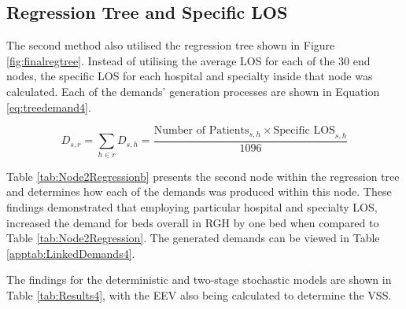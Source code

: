 \documentclass[../thesis.tex]{subfiles}
\begin{document}
\subsection{Regression Tree and Specific LOS}
The second method also utilised the regression tree shown in Figure \ref{fig:finalregtree}. Instead of utilising the average LOS for each of the 30 end nodes, the specific LOS for each hospital and specialty inside that node was calculated. Each of the demands' generation processes are shown in Equation \eqref{eq:treedemand4}.

\begin{equation}\label{eq:treedemand4}
        D_{s,r} = \sum\limits_{h \in r} D_{s,h} = \frac{\text{Number of Patients}_{s,h}\times{\text{Specific LOS}_{s,h}}}{1096}
\end{equation}

Table \ref{tab:Node2Regressionb} presents the second node within the regression tree and determines how each of the demands was produced within this node. These findings demonstrated that employing particular hospital and specialty LOS, increased the demand for beds overall in RGH by one bed when compared to Table \ref{tab:Node2Regression}. The generated demands can be viewed in Table \ref{apptab:LinkedDemands4}.

\begin{table}[h!]
    \centering{}
    \caption{The count of admissions and the associated specific LOS for each hospital and specialty within the second node of the regression tree. The average daily bed demand has additionally been calculated.}
    \label{tab:Node2Regressionb}
\end{table}

The findings for the deterministic and two-stage stochastic models are shown in Table \ref{tab:Results4}, with the EEV also being calculated to determine the VSS.
\end{document}
